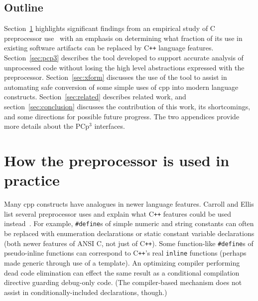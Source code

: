 \documentclass{article}
\newcommand{\pcp}{\mbox{\textsf{PCp}$^3$}}
\newcommand{\Cpp}{\mbox{\textsf{cpp}}}
\newcommand{\CPP}{\mbox{C\texttt{++}}}
\newcommand{\C}{\mbox{C}}
\newcommand{\ppd}[1]{\texttt{\##1}}
\begin{document}
\subsection{Outline}

Section~\ref{sec:feasibility} highlights significant findings from an
empirical study of \C{} preprocessor use~\cite{EmpCpp} with an emphasis on
determining what fraction of its use in existing software
artifacts can be replaced by \CPP{} language features.
Section~\ref{sec:pcp3} describes the tool developed to
support accurate analysis of unprocessed code without losing the high
level abstractions expressed with the preprocessor.  
Section~\ref{sec:xform} discusses the use of the tool to assist in automating
safe conversion of some simple uses of \Cpp{} into modern language constructs.
Section~\ref{sec:related} describes related work, and
section~\ref{sec:conclusion} discusses the contribution of this work, its
shortcomings, and some directions for possible future progress. The two appendices
provide more details about the \pcp{} interfaces.


\section{How the preprocessor is used in practice}
\label{sec:feasibility}
Many \Cpp{} constructs have analogues in newer language
features.  Carroll and Ellis list several preprocessor uses and explain
what \CPP{} features could be used instead~\cite{Carroll95}. For
example, \ppd{define}s of simple numeric and string constants can often
be replaced with enumeration declarations or static constant variable
declarations (both newer features of ANSI \C{}, not just of \CPP{}).
Some function-like \ppd{define}s of pseudo-inline functions can
correspond to \CPP{}'s real \texttt{inline} functions (perhaps made
generic through use of a template).  An optimizing compiler performing
dead code elimination can effect the same result as a
conditional compilation directive guarding debug-only code.  (The
compiler-based mechanism does not assist in conditionally-included
declarations, though.)

\end{document}
